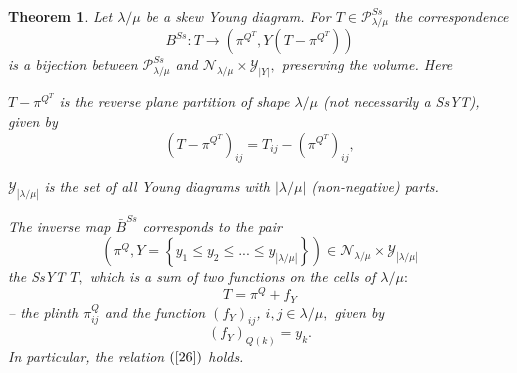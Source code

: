 \documentclass[12pt]{article}%
\newtheorem{theorem}{Theorem}
\begin{document}
\begin{theorem}
Let $\lambda/\mu$ be a skew Young diagram. For $T\in\mathcal{P}_{\lambda/\mu
}^{Ss}$ the correspondence
\begin{equation}
B^{Ss}:T\rightarrow\left(  \pi^{Q^{T}},Y\left(  T-\pi^{Q^{T}}\right)  \right)
\label{31}%
\end{equation}
is a bijection between $\mathcal{P}_{\lambda/\mu}^{Ss}$ and $\mathcal{N}%
_{\lambda/\mu}\times\mathcal{Y}_{\left\vert Y\right\vert },$ preserving the
volume. Here

$T-\pi^{Q^{T}}$ is the reverse plane partition of shape $\lambda/\mu$ (not
necessarily a SsYT), given by%
\[
\left(  T-\pi^{Q^{T}}\right)  _{ij}=T_{ij}-\left(  \pi^{Q^{T}}\right)  _{ij},
\]


$\mathcal{Y}_{\left\vert \lambda/\mu\right\vert }$ is the set of all Young
diagrams with $\left\vert \lambda/\mu\right\vert $ (non-negative) parts.

The inverse map $\bar{B}^{Ss}$ corresponds to the pair
\[
\left(  \pi^{Q},Y=\left\{  y_{1}\leq y_{2}\leq...\leq y_{\left\vert
\lambda/\mu\right\vert }\right\}  \right)  \in\mathcal{N}_{\lambda/\mu}%
\times\mathcal{Y}_{\left\vert \lambda/\mu\right\vert }%
\]
the SsYT $T,$ which is a sum of two functions on the cells of $\lambda/\mu:$
\begin{equation}
T=\pi^{Q}+f_{Y} \label{32}%
\end{equation}
-- the plinth $\pi_{ij}^{Q}$ and the function $\left(  f_{Y}\right)  _{ij}$,
$i,j\in\lambda/\mu,$ given by\newline%
\begin{equation}
\left(  f_{Y}\right)  _{Q\left(  k\right)  }=y_{k}. \label{33}%
\end{equation}
In particular, the relation $\left(  \ref{26}\right)  $ holds.
\end{theorem}
\end{document}
